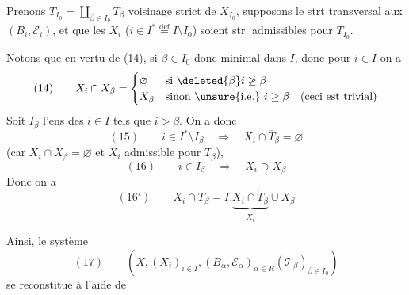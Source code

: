 Prenons $T_{I_0}=\coprod_{\beta\in I_0}T_\beta$ voisinage
 strict
de $X_{I_0}$, supposons le strt transversal aux
$(B_i,\mathcal E_i)$, et  que les $X_i$
($i\in I^*\overset{\mathrm{def}}=I\setminus I_0$)
soient str. admissibles pour $\overline T_{I_0}$.

Notons que en vertu de (14), si $\beta\in I_0$ donc
minimal dans $I$, donc pour $i\in I$ on a
\[
(14)\qquad
X_i\cap X_\beta=
\begin{cases}
\varnothing & \text{si }\deleted{\beta}i\not\ge\beta\\
X_\beta & \text{sinon \unsure{i.e.} }i\ge\beta\quad(\text{ceci est trivial})
\end{cases}
\]
Soit $I_\beta$ l'ens des $i\in I$ tels que $i>\beta$.
On a donc
\[
(15)\qquad i\in I^*\setminus I_\beta\quad\Longrightarrow\quad
X_i\cap\overline T_\beta=\varnothing
\]
(car $X_i\cap X_\beta=\varnothing$ et $X_i$ admissible pour $\overline T_\beta$),
\[
(16)\qquad i\in I_\beta\quad\Longrightarrow\quad X_i\supset X_\beta
\]
Donc on a
\[
(16')\qquad X_i\cap T_\beta
=I.\underbrace{X_i\cap\dot T_\beta}_{\dot X_i}\cup X_\beta
\]

Ainsi, le système
\[
(17)\qquad
(X,(X_i)_{i\in I},(B_\alpha,\mathcal E_\alpha)_{\alpha\in R}
(\mathcal T_\beta)_{\beta\in I_0})
\]
se reconstitue à l'aide de

